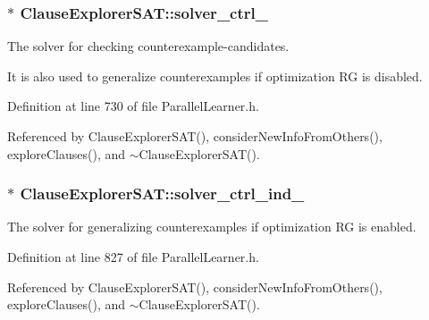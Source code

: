 \hypertarget{classClauseExplorerSAT_a7884d171120e8397140e30fdc28767eb}{
\subsubsection[{solver\-\_\-ctrl\-\_\-}]{$\ast$ Clause\-Explorer\-S\-A\-T\-::solver\-\_\-ctrl\-\_\-\hspace{0.3cm}{\ttfamily [protected]}}}\label{classClauseExplorerSAT_a7884d171120e8397140e30fdc28767eb}


The solver for checking counterexample-\/candidates. 

It is also used to generalize counterexamples if optimization R\-G is disabled. 

Definition at line 730 of file Parallel\-Learner.\-h.



Referenced by Clause\-Explorer\-S\-A\-T(), consider\-New\-Info\-From\-Others(), explore\-Clauses(), and $\sim$\-Clause\-Explorer\-S\-A\-T().

\hypertarget{classClauseExplorerSAT_aba4c9ed8ccc28d89c094f3cd80157f3f}{
\subsubsection[{solver\-\_\-ctrl\-\_\-ind\-\_\-}]{$\ast$ Clause\-Explorer\-S\-A\-T\-::solver\-\_\-ctrl\-\_\-ind\-\_\-\hspace{0.3cm}{\ttfamily [protected]}}}\label{classClauseExplorerSAT_aba4c9ed8ccc28d89c094f3cd80157f3f}


The solver for generalizing counterexamples if optimization R\-G is enabled. 



Definition at line 827 of file Parallel\-Learner.\-h.



Referenced by Clause\-Explorer\-S\-A\-T(), consider\-New\-Info\-From\-Others(), explore\-Clauses(), and $\sim$\-Clause\-Explorer\-S\-A\-T().

